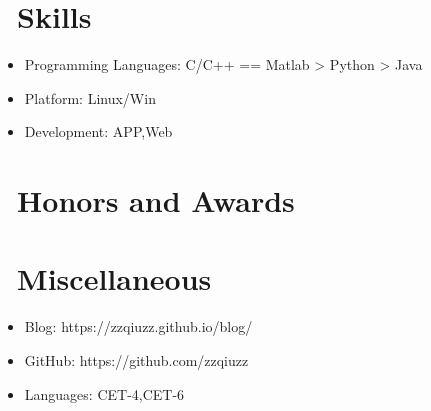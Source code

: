 \documentclass{resume}
\begin{document}
\section{\faCogs\ Skills}
\begin{itemize}[parsep=0.5ex]
  \item Programming Languages: C/C++ == Matlab > Python > Java
  \item Platform: Linux/Win
  \item Development: APP,Web 
\end{itemize}

\section{\faHeartO\ Honors and Awards}

\section{\faInfo\ Miscellaneous}
\begin{itemize}[parsep=0.5ex]
  \item Blog: https://zzqiuzz.github.io/blog/
  \item GitHub: https://github.com/zzqiuzz
  \item Languages: CET-4,CET-6
\end{itemize}

%
%
\end{document}
